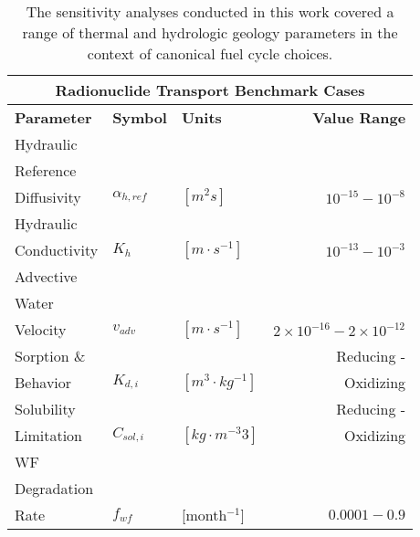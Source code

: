 
\begin{table}[ht!]
\centering
\footnotesize{
  \begin{tabularx}{\textwidth}{|X|l|l|r|}
\multicolumn{4}{c}{\textbf{Radionuclide Transport Benchmark Cases}}\\
\hline
\textbf{Parameter} & \textbf{Symbol} & \textbf{Units} & \textbf{Value Range} \\
\hline
Hydraulic & & & \\
Reference & & & \\
Diffusivity& $\alpha_{h,ref}$& $[m^2s]$ & $10^{-15} - 10^{-8}$ \\
\hline
Hydraulic & & & \\
Conductivity& $K_{h}$& $[m \cdot s^{-1}]$ & $10^{-13} - 10^{-3}$ \\
\hline
Advective  & & & \\
Water & & & \\
Velocity & $v_{adv}$ & $[m\cdot s^{-1}]$ & $2\times10^{-16}-2\times10^{-12}$ \\
\hline
Sorption \& & & & Reducing - \\
Behavior & $K_{d,i}$& $[m^3\cdot kg^{-1}]$ & Oxidizing \\
\hline
Solubility &  & & Reducing -\\
Limitation & $C_{sol,i}$ & $[kg\cdot m^{-3}3]$& Oxidizing \\
\hline
WF& & & \\
Degradation& & & \\
Rate& $f_{wf}$ & [month$^{-1}$]& $0.0001-0.9$ \\
\hline
\end{tabularx}
\caption{The sensitivity analyses conducted in this work covered a range of 
thermal and hydrologic geology parameters in the context of canonical fuel cycle choices.}
}
\label{tab:nuclide_bench_tab}
\end{table}

